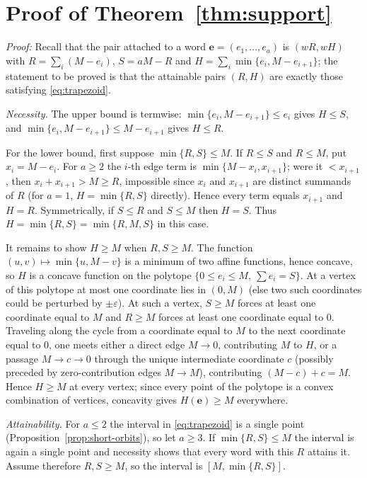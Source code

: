 \documentclass[preprint,12pt,a4paper]{elsarticle}
\theoremstyle{definition}
\theoremstyle{remark}
\begin{document}
\appendix

\section{Proof of Theorem~\ref{thm:support}}\label{app:support}

\noindent\emph{Proof:} Recall that the pair attached to a word
$\mathbf{e}=(e_1,\ldots,e_a)$ is $(wR,wH)$ with
$R=\sum_i(M-e_i)$, $S=aM-R$ and $H=\sum_i\min\{e_i,M-e_{i+1}\}$; the
statement to be proved is that the attainable pairs $(R,H)$ are exactly those
satisfying \eqref{eq:trapezoid}.

\emph{Necessity.}  The upper bound is termwise:
$\min\{e_i,M-e_{i+1}\}\leq e_i$ gives $H\leq S$, and
$\min\{e_i,M-e_{i+1}\}\leq M-e_{i+1}$ gives $H\leq R$.

For the lower bound, first suppose $\min\{R,S\}\leq M$.  If $R\leq S$ and
$R\leq M$, put $x_i=M-e_i$.  For $a\geq2$ the $i$-th edge term is
$\min\{M-x_i,x_{i+1}\}$; were it $<x_{i+1}$, then $x_i+x_{i+1}>M\geq R$,
impossible since $x_i$ and $x_{i+1}$ are distinct summands of $R$ (for $a=1$,
$H=\min\{R,S\}$ directly).  Hence every term equals $x_{i+1}$ and $H=R$.
Symmetrically, if $S\leq R$ and $S\leq M$ then $H=S$.  Thus
$H=\min\{R,S\}=\min\{R,M,S\}$ in this case.

It remains to show $H\geq M$ when $R,S\geq M$.  The function
$(u,v)\mapsto\min\{u,M-v\}$ is a minimum of two affine functions, hence
concave, so $H$ is a concave function on the polytope
$\{0\leq e_i\leq M,\ \sum e_i=S\}$.  At a vertex of this polytope at most one
coordinate lies in $(0,M)$ (else two such coordinates could be perturbed by
$\pm\varepsilon$).  At such a vertex, $S\geq M$ forces at least one coordinate
equal to $M$ and $R\geq M$ forces at least one coordinate equal to $0$.
Traveling along the cycle from a coordinate equal to $M$ to the next coordinate
equal to $0$, one meets either a direct edge $M\to0$, contributing $M$ to $H$,
or a passage $M\to c\to0$ through the unique intermediate coordinate $c$
(possibly preceded by zero-contribution edges $M\to M$), contributing
$(M-c)+c=M$.  Hence $H\geq M$ at every vertex; since every point of the
polytope is a convex combination of vertices, concavity gives
$H(\mathbf{e})\geq M$ everywhere.

\emph{Attainability.}  For $a\leq2$ the interval in \eqref{eq:trapezoid} is a
single point (Proposition~\ref{prop:short-orbits}), so let $a\geq3$.  If
$\min\{R,S\}\leq M$ the interval is again a single point and necessity shows
that every word with this $R$ attains it.  Assume therefore $R,S\geq M$, so
the interval is $[M,\min\{R,S\}]$.
\end{document}
